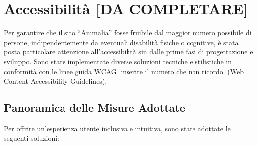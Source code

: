 \section{Accessibilit\`a  [DA COMPLETARE]} 
Per garantire che il sito ``Animalia'' fosse fruibile dal maggior numero possibile di persone, indipendentemente da eventuali disabilità fisiche o cognitive, è stata posta particolare attenzione all'accessibilità sin dalle prime fasi di progettazione e sviluppo. Sono state implementate diverse soluzioni tecniche e stilistiche in conformità con le linee guida WCAG [inserire il numero che non ricordo] (Web Content Accessibility Guidelines).

\subsection{Panoramica delle Misure Adottate}
Per offrire un'esperienza utente inclusiva e intuitiva, sono state adottate le seguenti soluzioni:
